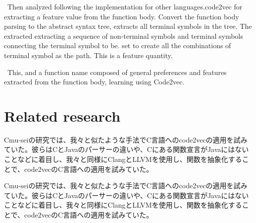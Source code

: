 \documentclass[JIP]{apris}
\begin{document}
 Then analyzed following the implementation for other languages ​​.code2vec for extracting a feature value from the function body. Convert the function body parsing to the abstract syntax tree, extracts all terminal symbols in the tree. The extracted extracting a sequence of non-terminal symbols and terminal symbols connecting the terminal symbol to be. set to create all the combinations of terminal symbol as the path. This is a feature quantity.

 This, and a function name composed of general preferences and features extracted from the function body, learning using Code2vec.

\section{Related research}
Cmu-seiの研究では、我々と似たような手法でC言語へのcode2vecの適用を試みていた。彼らはCとJavaのパーサーの違いや、Cにある関数宣言がJavaにはないことなどに着目し、我々と同様にClangとLLVMを使用し、関数を抽象化することで、code2vecのC言語への適用を試みていた。

Cmu-seiの研究では、我々と似たような手法でC言語へのcode2vecの適用を試みていた。彼らはCとJavaのパーサーの違いや、Cにある関数宣言がJavaにはないことなどに着目し、我々と同様にClangとLLVMを使用し、関数を抽象化することで、code2vecのC言語への適用を試みていた。


\end{document}
